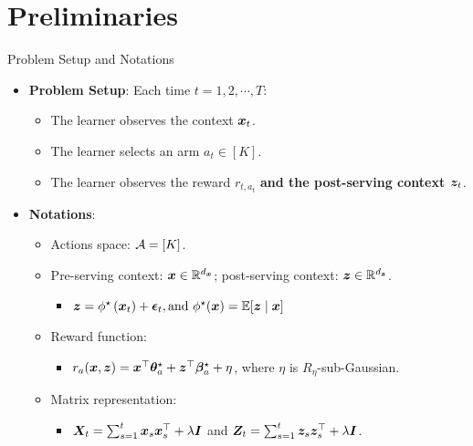 \documentclass[10pt, xcolor={dvipsnames,x11names},compress]{beamer}
\begin{document}
\section{Preliminaries}
\begin{frame}[label=Background]{Problem Setup and Notations}

\begin{itemize}
    \item \textbf{Problem Setup}: Each time $t = 1, 2, \cdots, T$:
    \begin{itemize}
        \item The learner observes the context ${\bm{x}}_t$.
        \item The learner selects an arm $a_t \in [K] $.
        \item The learner observes the reward $r_{t,a_t}$ \textbf{and the post-serving context ${\bm{z}}_t$}.
    \end{itemize}
\end{itemize}

\begin{itemize}
    \item \textbf{Notations}:
    \begin{itemize}
        \item Actions space: ${\mathcal{A}} = [K]$.
        
        \item Pre-serving context: ${\bm{x}} \in {\mathbb{R}}^{d_{{\bm{x}}}}$; post-serving context: ${\bm{z}} \in {\mathbb{R}}^{d_{{\bm{z}}}}$.
        \begin{itemize}
            \item ${\bm{z}} = \phi^{\star}\left({\bm{x}}_t\right)+{\bm{\epsilon}}_t, \text{and } \phi^{\star}({\bm{x}})={\mathbb{E}}[{\bm{z}} \mid {\bm{x}}]$
        \end{itemize}
        
        \item Reward function: 
        \begin{itemize}
            \item $r_{a}({\bm{x}}, {\bm{z}}) = {\bm{x}}^\top {\bm{\theta}}_a^\star + {\bm{z}}^\top {\bm{\beta}}_a^\star + \eta$, where $\eta$ is $R_{\eta}$-sub-Gaussian.
        \end{itemize}
        
        \item Matrix representation: 
        \begin{itemize}
            \item ${\bm{X}}_{t} = \sum_{s=1}^t {\bm{x}}_s{\bm{x}}_s^\top + \lambda {\bm{I}}$ and ${\bm{Z}}_t = \sum_{s=1}^t {\bm{z}}_s {\bm{z}}_s^\top + \lambda {\bm{I}}$.
        \end{itemize}
        

\end{itemize}
\end{itemize}
\end{frame}
\end{document}
